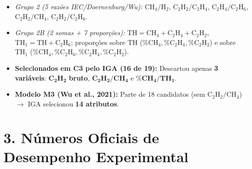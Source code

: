 \documentclass[10pt,a4paper]{article}
\begin{document}
\begin{summarybox}
\begin{itemize}[leftmargin=0.5cm, itemsep=2pt]
\begin{itemize}[leftmargin=0.4cm]
    \item \textit{Grupo 2 (5 razões IEC/Doernenburg/Wu):} $\text{CH}_4/\text{H}_2$, $\text{C}_2\text{H}_2/\text{C}_2\text{H}_4$, $\text{C}_2\text{H}_4/\text{C}_2\text{H}_6$, $\text{C}_2\text{H}_2/\text{CH}_4$, $\text{C}_2\text{H}_2/\text{C}_2\text{H}_6$.
    \item \textit{Grupo 2B (2 somas + 7 proporções):} $\text{TH} = \text{CH}_4 + \text{C}_2\text{H}_4 + \text{C}_2\text{H}_2$, $\text{TH}_1 = \text{TH} + \text{C}_2\text{H}_6$; proporções sobre $\text{TH}$ ($\%\text{CH}_4, \%\text{C}_2\text{H}_4, \%\text{C}_2\text{H}_2$) e sobre $\text{TH}_1$ ($\%\text{CH}_4, \%\text{C}_2\text{H}_6, \%\text{C}_2\text{H}_4, \%\text{C}_2\text{H}_2$).
    \item \textbf{Selecionados em C3 pelo IGA (16 de 19):} Descartou apenas \textbf{3 variáveis}: $\mathbf{\text{C}_2\text{H}_2}$ \textbf{bruto}, $\mathbf{\text{C}_2\text{H}_2/\text{CH}_4}$ e $\mathbf{\%\text{CH}_4/\text{TH}_1}$.
    \item \textbf{Modelo M3 (Wu et al., 2021):} Parte de 18 candidatos (sem $\text{C}_2\text{H}_2/\text{CH}_4$) $\to$ IGA selecionou \textbf{14 atributos}.
  \end{itemize}
\end{itemize}
\end{summarybox}

\section*{3. Números Oficiais de Desempenho Experimental}
\end{document}
